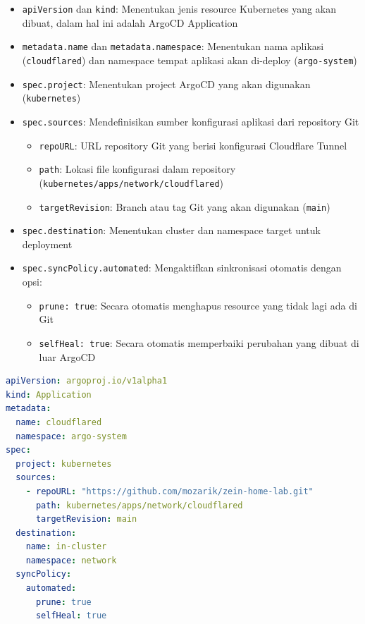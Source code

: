 \begin{itemize}
  \item \texttt{apiVersion} dan \texttt{kind}: Menentukan jenis resource Kubernetes yang akan dibuat, dalam hal ini adalah ArgoCD Application
  \item \texttt{metadata.name} dan \texttt{metadata.namespace}: Menentukan nama aplikasi (\texttt{cloudflared}) dan namespace tempat aplikasi akan di-deploy (\texttt{argo-system})
  \item \texttt{spec.project}: Menentukan project ArgoCD yang akan digunakan (\texttt{kubernetes})
  \item \texttt{spec.sources}: Mendefinisikan sumber konfigurasi aplikasi dari repository Git
        \begin{itemize}
          \item \texttt{repoURL}: URL repository Git yang berisi konfigurasi Cloudflare Tunnel
          \item \texttt{path}: Lokasi file konfigurasi dalam repository (\texttt{kubernetes/apps/network/cloudflared})
          \item \texttt{targetRevision}: Branch atau tag Git yang akan digunakan (\texttt{main})
        \end{itemize}
  \item \texttt{spec.destination}: Menentukan cluster dan namespace target untuk deployment
  \item \texttt{spec.syncPolicy.automated}: Mengaktifkan sinkronisasi otomatis dengan opsi:
        \begin{itemize}
          \item \texttt{prune: true}: Secara otomatis menghapus resource yang tidak lagi ada di Git
          \item \texttt{selfHeal: true}: Secara otomatis memperbaiki perubahan yang dibuat di luar ArgoCD
        \end{itemize}
\end{itemize}

\begin{lstlisting}[language=yaml, 
  basicstyle=\footnotesize\ttfamily,
  caption={Konfigurasi ArgoCD untuk instalasi Cloudflare Tunnel},
  label={lst:cloudflared-argocd}]
apiVersion: argoproj.io/v1alpha1
kind: Application
metadata:
  name: cloudflared
  namespace: argo-system
spec:
  project: kubernetes
  sources:
    - repoURL: "https://github.com/mozarik/zein-home-lab.git"
      path: kubernetes/apps/network/cloudflared
      targetRevision: main
  destination:
    name: in-cluster
    namespace: network
  syncPolicy:
    automated:
      prune: true
      selfHeal: true
\end{lstlisting}

